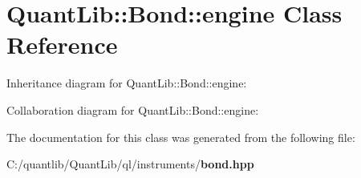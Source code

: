 \section{Quant\+Lib\+:\+:Bond\+:\+:engine Class Reference}
\label{class_quant_lib_1_1_bond_1_1engine}


Inheritance diagram for Quant\+Lib\+:\+:Bond\+:\+:engine\+:


Collaboration diagram for Quant\+Lib\+:\+:Bond\+:\+:engine\+:


The documentation for this class was generated from the following file\+:\begin{DoxyCompactItemize}
\item 
C\+:/quantlib/\+Quant\+Lib/ql/instruments/{\bf bond.\+hpp}\end{DoxyCompactItemize}
